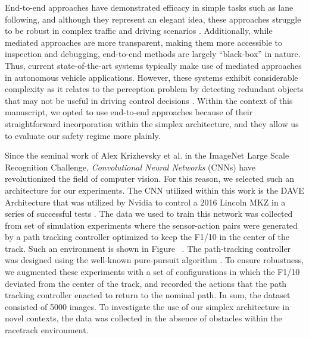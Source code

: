 \documentclass[manuscript,screen,review]{acmart}
\begin{document}


End-to-end approaches have demonstrated efficacy in simple tasks such as lane following, and although they represent an elegant idea, these approaches struggle to be robust in complex traffic and driving scenarios  \cite{DeepPiCar2017}. Additionally, while mediated approaches are more transparent, making them more accessible to inspection and debugging, end-to-end methods are largely ``black-box'' in nature. Thus, current state-of-the-art systems typically make use of mediated approaches in autonomous vehicle applications. However, these systems exhibit considerable complexity as it relates to the perception problem by detecting redundant objects that may not be useful in driving control decisions \cite{DirectPerception2019}. Within the context of this manuscript, we opted to use end-to-end approaches because of their straightforward incorporation within the simplex architecture, and they allow us to evaluate our safety regime more plainly.

Since the seminal work of Alex Krizhevsky et al. \cite{AlexNet2012} in the ImageNet Large Scale Recognition Challenge, \emph{Convolutional Neural Networks} (CNNs) have revolutionized the field of computer vision. For this reason, we selected such an architecture for our experiments. The CNN utilized within this work is the DAVE Architecture that was utilized by Nvidia to control a 2016 Lincoln MKZ in a series of successful tests \cite{bojarski2016end}. The data we used to train this network was collected from set of simulation experiments where the sensor-action pairs were generated by a path tracking controller optimized to keep the F1/10 in the center of the track. Such an environment is shown in Figure ~\cite{figures/gazebo.jpg}. The path-tracking controller was designed using the well-known pure-pursuit algorithm \cite{coulter1992implementation}. To ensure robustness, we augmented these experiments with a set of configurations in which the F1/10 deviated from the center of the track, and recorded the actions that the path tracking controller enacted to return to the nominal path. In sum, the dataset consisted of 5000 images.  To investigate the use of our simplex architecture in novel contexts, the data was collected in the absence of obstacles within the racetrack environment.
\end{document}
